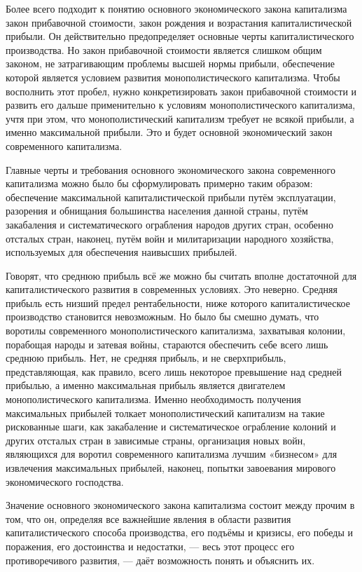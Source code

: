 \documentclass[12pt, a4paper, openany]{book}
\begin{document}
Более всего подходит к понятию основного экономического закона капитализма закон прибавочной стоимости, закон рождения и возрастания капиталистической прибыли. Он действительно предопределяет основные черты капиталистического производства. Но закон прибавочной стоимости является слишком общим законом, не затрагивающим проблемы высшей нормы прибыли, обеспечение которой является условием развития монополистического капитализма. Чтобы восполнить этот пробел, нужно конкретизировать закон прибавочной стоимости и развить его дальше применительно к условиям монополистического капитализма, учтя при этом, что монополистический капитализм требует не всякой прибыли, а именно максимальной прибыли. Это и будет основной экономический закон современного капитализма.



Главные черты и требования основного экономического закона современного капитализма можно было бы сформулировать примерно таким образом: обеспечение максимальной капиталистической прибыли путём эксплуатации, разорения и обнищания большинства населения данной страны, путём закабаления и систематического ограбления народов других стран, особенно отсталых стран, наконец, путём войн и милитаризации народного хозяйства, используемых для обеспечения наивысших прибылей.



Говорят, что среднюю прибыль всё же можно бы считать вполне достаточной для капиталистического развития в современных условиях. Это неверно. Средняя прибыль есть низший предел рентабельности, ниже которого капиталистическое производство становится невозможным. Но было бы смешно думать, что воротилы современного монополистического капитализма, захватывая колонии, порабощая народы и затевая войны, стараются обеспечить себе всего лишь среднюю прибыль. Нет, не средняя прибыль, и не сверхприбыль, представляющая, как правило, всего лишь некоторое превышение над средней прибылью, а именно максимальная прибыль является двигателем монополистического капитализма. Именно необходимость получения максимальных прибылей толкает монополистический капитализм на такие рискованные шаги, как закабаление и систематическое ограбление колоний и других отсталых стран в зависимые страны, организация новых войн, являющихся для воротил современного капитализма лучшим «бизнесом» для извлечения максимальных прибылей, наконец, попытки завоевания мирового экономического господства.



Значение основного экономического закона капитализма состоит между прочим в том, что он, определяя все важнейшие явления в области развития капиталистического способа производства, его подъёмы и кризисы, его победы и поражения, его достоинства и недостатки, — весь этот процесс его противоречивого развития, — даёт возможность понять и объяснить их.
\end{document}
